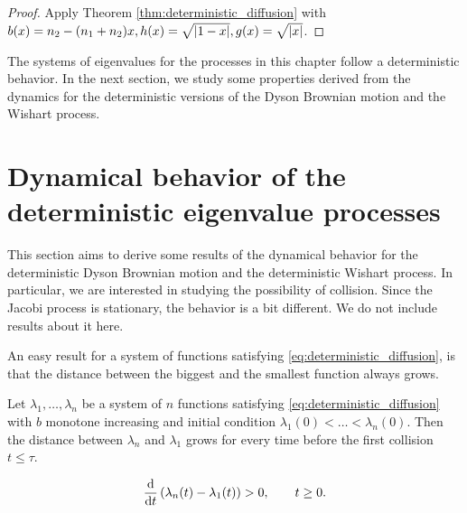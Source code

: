 \begin{proof}
    Apply Theorem \ref{thm:deterministic_diffusion} with $b(x) = n_2 - (n_1+n_2)x, h(x) = \sqrt{\lvert 1-x \rvert}, g(x)=\sqrt{\lvert x \rvert}$. 
\end{proof}

The systems of eigenvalues for the processes in this chapter follow a deterministic behavior. In the next section, we study some properties derived from the dynamics for the deterministic versions of the Dyson Brownian motion and the Wishart process.

\section{Dynamical behavior of the deterministic eigenvalue processes}

This section aims to derive some results of the dynamical behavior for the deterministic Dyson Brownian motion and the deterministic Wishart process. In particular, we are interested in studying the possibility of collision. Since the Jacobi process is stationary, the behavior is a bit different. We do not include results about it here.

An easy result for a system of functions satisfying \eqref{eq:deterministic_diffusion}, is that the distance between the biggest and the smallest function always grows.


\begin{proposition} \label{proposition:total_distance_grows}
     Let $\lambda_1, \dots, \lambda_n$ be a system of $n$ functions satisfying \eqref{eq:deterministic_diffusion} with $b$ monotone increasing and initial condition $\lambda_1(0) < \dots < \lambda_n(0)$. Then the distance between $\lambda_n$ and $\lambda_1$ grows for every time before the first collision $t\le \tau$.

     \begin{equation*}
         \frac{\mathrm d}{\mathrm d t}\left( \lambda_n(t) - \lambda_1(t) \right) > 0, \qquad t \ge 0.
     \end{equation*}
\end{proposition}

